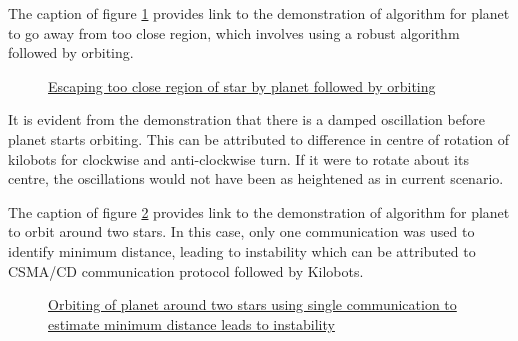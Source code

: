 \documentclass{report}[12pt]
\begin{document}
The caption of figure \ref{fig:orbit_after_escape} provides link to the demonstration of algorithm for planet to go away from too close region, which involves using a robust algorithm followed by orbiting.
\begin{figure}[H]
	\centering
	\caption{\href{https://youtu.be/X6dGCLT0ho8}{Escaping too close region of star by planet followed by orbiting}}
	\label{fig:orbit_after_escape}
\end{figure}
It is evident from the demonstration that there is a damped oscillation before planet starts orbiting. This can be attributed to difference in centre of rotation of kilobots for clockwise and anti-clockwise turn. If it were to rotate about its centre, the oscillations would not have been as heightened as in current scenario.

The caption of figure \ref{fig:orbit_two_star_comm1} provides link to the demonstration of algorithm for planet to orbit around two stars. In this case, only one communication was used to identify minimum distance, leading to instability which can be attributed to CSMA/CD \cite{WEBOPEDIA-csma-cd} communication protocol followed by Kilobots.
\begin{figure}[H]
	\centering
	\caption{\href{https://youtu.be/mhW04WvGKuQ}{Orbiting of planet around two stars using single communication to estimate minimum distance leads to instability}}
	\label{fig:orbit_two_star_comm1}
\end{figure}
\end{document}
